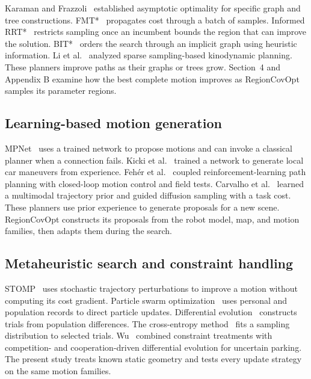 \documentclass[a4paper]{cas-sc}
\begin{document}
Karaman and Frazzoli~\cite{rrt} established asymptotic optimality for specific graph and tree constructions. FMT*~\cite{fmt} propagates cost through a batch of samples. Informed RRT*~\cite{informed} restricts sampling once an incumbent bounds the region that can improve the solution. BIT*~\cite{bit} orders the search through an implicit graph using heuristic information. Li et al.~\cite{sst} analyzed sparse sampling-based kinodynamic planning. These planners improve paths as their graphs or trees grow. Section~4 and Appendix B examine how the best complete motion improves as RegionCovOpt samples its parameter regions.

\subsection{Learning-based motion generation}
MPNet~\cite{mpnet} uses a trained network to propose motions and can invoke a classical planner when a connection fails. Kicki et al.~\cite{eaai1} trained a network to generate local car maneuvers from experience. Feh\'er et al.~\cite{eaai3} coupled reinforcement-learning path planning with closed-loop motion control and field tests. Carvalho et al.~\cite{diffusion} learned a multimodal trajectory prior and guided diffusion sampling with a task cost. These planners use prior experience to generate proposals for a new scene. RegionCovOpt constructs its proposals from the robot model, map, and motion families, then adapts them during the search.

\subsection{Metaheuristic search and constraint handling}
STOMP~\cite{stomp} uses stochastic trajectory perturbations to improve a motion without computing its cost gradient. Particle swarm optimization~\cite{pso} uses personal and population records to direct particle updates. Differential evolution~\cite{de} constructs trials from population differences. The cross-entropy method~\cite{cem} fits a sampling distribution to selected trials. Wu~\cite{eaai4} combined constraint treatments with competition- and cooperation-driven differential evolution for uncertain parking. The present study treats known static geometry and tests every update strategy on the same motion families.
\end{document}
